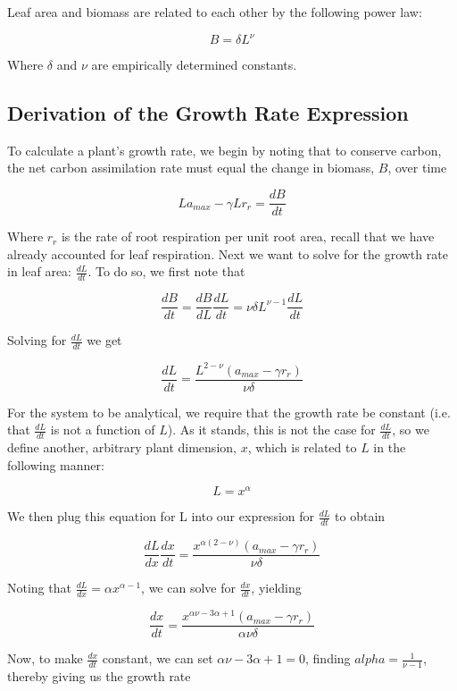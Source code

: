 \documentclass{article}
\begin{document}
  Leaf area and biomass are related to each other by the following power law:

  \begin{equation} \label{power allometry}
    B = \delta L^{\nu}
  \end{equation}

  Where $\delta$ and $\nu$ are empirically determined constants.

  \subsection{Derivation of the Growth Rate Expression} \label{G derivation}

  To calculate a plant's growth rate, we begin by noting
  that to conserve carbon, the net carbon assimilation rate must
  equal the change in biomass, $B$, over time

  $$ L a_{max} - \gamma L r_{r} = \frac{dB}{dt}$$

  Where $r_{r}$ is the rate of root respiration per unit root area, recall that
  we have already accounted for leaf respiration. Next we want to solve for the
  growth rate in leaf area: $\frac{dL}{dt}$. To do so, we first note that

  $$ \frac{dB}{dt} = \frac{dB}{dL} \frac{dL}{dt} = \nu \delta L^{\nu - 1} \frac{dL}{dt} $$

  Solving for $\frac{dL}{dt}$ we get

  $$ \frac{dL}{dt} = \frac{L^{2 - \nu} ( a_{max} - \gamma r_{r})}{\nu \delta} $$

  For the system to be analytical, we require that the growth rate be
  constant (i.e. that $\frac{dL}{dt}$ is not a function of $L$). As it stands, this is not the
  case for $\frac{dL}{dt}$, so we define another, arbitrary plant dimension,
  $x$, which is related to $L$ in the following manner:

  $$ L = x^{\alpha} $$

  We then plug this equation for L into our expression for $\frac{dL}{dt}$ to
  obtain

  $$ \frac{dL}{dx}\frac{dx}{dt} = \frac{x^{\alpha(2 - \nu)}(a_{max} - \gamma r_{r})}{\nu \delta} $$

  Noting that $\frac{dL}{dx} = \alpha x^{\alpha - 1}$, we can solve for
  $\frac{dx}{dt}$, yielding

  $$ \frac{dx}{dt} = \frac{x^{\alpha \nu - 3\alpha + 1}(a_{max} - \gamma r_{r})}{\alpha \nu \delta} $$

  Now, to make $\frac{dx}{dt}$ constant, we can set
  $\alpha \nu - 3 \alpha + 1 = 0$, finding $alpha = \frac{1}{\nu - 1}$, thereby
  giving us the growth rate
\end{document}
